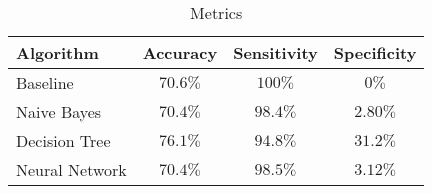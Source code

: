 \begin{table}[!ht]
	\begin{center}
		\caption{Metrics}
		\label{metrics}
		\begin{tabular}{ l | c | c | c  }
			Algorithm & Accuracy & Sensitivity & Specificity \\
			\hline		
			Baseline & $70.6\%$ & $100\%$ & $0\%$ \\
			Naive Bayes & $70.4\%$ & $98.4\%$ & $2.80\%$ \\
			Decision Tree & $76.1\%$ & $94.8\%$ & $31.2\%$ \\
			Neural Network & $70.4\%$ & $98.5\%$ & $3.12\%$
		\end{tabular}
	\end{center}
\end{table}